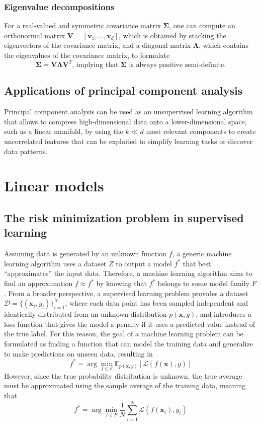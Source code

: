\documentclass{report}
\begin{document}
\subsection{Eigenvalue decompositions}
For a real-valued and symmetric covariance matrix $\mathbf{\Sigma}$, one can compute an orthonormal matrix $\displaystyle \mathbf{V} = [\mathbf{v}_1, \dots, \mathbf{v}_d]$, which is obtained by stacking the eigenvectors of the covariance matrix, and a diagonal matrix $\displaystyle \mathbf{\Lambda}$, which contains the eigenvalues of the covariance matrix, to formulate
\[\mathbf{\Sigma} = \mathbf{V\Lambda V}^T \text{, implying that $\mathbf{\Sigma}$ is always positive semi-definite.}\]
\section{Applications of principal component analysis}
Principal component analysis can be used as an unsupervised learning algorithm that allows to compress high-dimensional data onto a lower-dimensional space, such as a linear manifold, by using the $\displaystyle k \ll d$ most relevant components to create uncorrelated features that can be exploited to simplify learning tasks or discover data patterns.

\chapter{Linear models}
\section{The risk minimization problem in supervised learning}
Assuming data is generated by an unknown function $\displaystyle f$, a generic machine learning algorithm uses a dataset $\displaystyle Z$ to output a model $\displaystyle f^*$ that best ``approximates'' the input data. \newline
Therefore, a machine learning algorithm aims to find an approximation $\displaystyle f \approx f^*$ by knowing that $\displaystyle f^*$ belongs to some model family $\displaystyle F$. \newline
From a broader perspective, a supervised learning problem provides a dataset $\displaystyle \mathcal{D} = \{(\mathbf{x}_i, y_i)\}_{i = 1}^N$, where each data point has been sampled independent and identically distributed from an unknown distribution $\displaystyle p(\mathbf{x}, y)$, and introduces a loss function that gives the model a penalty if it uses a predicted value instead of the true label. \newline
For this reason, the goal of a machine learning problem can be formulated as finding a function that can model the training data and generalize to make predictions on unseen data, resulting in
\[f^* = \arg\min_{f \in F} \mathbb{E}_{p(\mathbf{x}, y)}[\mathcal{L}(f(\mathbf{x}), y)]\]
However, since the true probability distribution is unknown, the true average must be approximated using the sample average of the training data, meaning that
\[f^* = \arg\min_{f \in F} \frac{1}{N}\sum_{i = 1}^N \mathcal{L}(f(\mathbf{x}_i), y_i)\]
\end{document}

